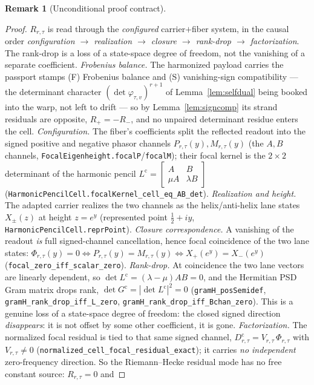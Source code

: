 \documentclass[11pt]{article}
\theoremstyle{definition}
\newtheorem{remark}[theorem]{Remark}
\begin{document}
\begin{remark}[Unconditional proof contract]
\begin{enumerate}
\begin{proof}
$R_{r,\tau}$ is read through the \emph{configured} carrier$+$fiber system, in the causal order
\emph{configuration $\to$ realization $\to$ closure $\to$ rank-drop $\to$ factorization}. The rank-drop is a
loss of a state-space degree of freedom, not the vanishing of a separate coefficient.
\emph{Frobenius balance.} The harmonized payload carries the passport stamps (F) Frobenius balance and
(S) vanishing-sign compatibility --- the determinant character $(\det\varphi_{\tau,v})^{r+1}$ of
Lemma~\ref{lem:selfdual} being booked into the warp, not left to drift --- so by
Lemma~\ref{lem:signcomp} its strand residuals are opposite, $R_+=-R_-$, and no unpaired determinant residue
enters the cell.
\emph{Configuration.} The fiber's coefficients split the reflected readout into the signed positive and
negative phasor channels $P_{r,\tau}(y),M_{r,\tau}(y)$ (the $A,B$ channels,
\texttt{FocalEigenheight.focalP}/\texttt{focalM}); their focal kernel is the $2\times2$ determinant of the
harmonic pencil $L^{\mathrm c}=\left[\begin{smallmatrix}A&B\\ \mu A&\lambda B\end{smallmatrix}\right]$
(\texttt{HarmonicPencilCell.focalKernel\_cell\_eq\_AB\_det}).
\emph{Realization and height.} The adapted carrier realizes the two channels as the helix/anti-helix lane
states $X_{\pm}(z)$ at height $z=e^{y}$ (represented point $\tfrac12+iy$, \texttt{HarmonicPencilCell.reprPoint}).
\emph{Closure correspondence.} A vanishing of the readout \emph{is} full signed-channel cancellation, hence
focal coincidence of the two lane states:
$\Phi_{r,\tau}(y)=0\iff P_{r,\tau}(y)=M_{r,\tau}(y)\iff X_{+}(e^{y})=X_{-}(e^{y})$
(\texttt{focal\_zero\_iff\_scalar\_zero}).
\emph{Rank-drop.} At coincidence the two lane vectors are linearly dependent, so
$\det L^{\mathrm c}=(\lambda-\mu)AB=0$, and the Hermitian PSD Gram matrix drops rank,
$\det G^{\mathrm c}=|\det L^{\mathrm c}|^{2}=0$ (\texttt{gramH\_posSemidef},
\texttt{gramH\_rank\_drop\_iff\_L\_zero}, \texttt{gramH\_rank\_drop\_iff\_Bchan\_zero}). This is a genuine
loss of a state-space degree of freedom: the closed signed direction \emph{disappears}: it is not offset by
some other coefficient, it is gone.
\emph{Factorization.} The normalized focal residual is tied to that same signed channel,
$D^{\mathrm c}_{r,\tau}=V_{r,\tau}\,\Phi_{r,\tau}$ with $V_{r,\tau}\neq0$
(\texttt{normalized\_cell\_focal\_residual\_exact}); it carries \emph{no independent} zero-frequency
direction. So the Riemann--Hecke residual mode has no free constant source: $R_{r,\tau}=0$ and

\end{proof}
\end{enumerate}
\end{remark}
\end{document}
